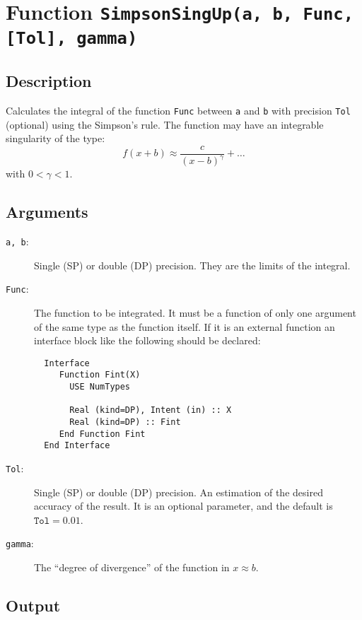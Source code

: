 \section{Function \texttt{SimpsonSingUp(a, b, Func, [Tol], gamma)}}

\subsection{Description}

Calculates the integral of the function \texttt{Func} between
\texttt{a} and \texttt{b} with precision \texttt{Tol} (optional) using
the Simpson's rule. The function may have an integrable singularity of
the type:
\begin{displaymath}
  f(x+b) \approx \frac{c}{(x-b)^\gamma} +  \dots
\end{displaymath}
with $0<\gamma<1$.

\subsection{Arguments}

\begin{description}
\item[\texttt{a, b}:] Single (SP) or double (DP) precision. They are
  the limits of the integral.
\item[\texttt{Func}:] The function to be integrated. It must be a
  function of only one argument of the same type as the function
  itself. If it is an
  external function an interface block like the following should be
  declared: 
\begin{verbatim}
  Interface 
     Function Fint(X)
       USE NumTypes

       Real (kind=DP), Intent (in) :: X
       Real (kind=DP) :: Fint
     End Function Fint
  End Interface
\end{verbatim}
\item[\texttt{Tol}:] Single (SP) or double (DP) precision. An
  estimation of the desired accuracy of the result. It is an optional
  parameter, and the default is $\mathtt{Tol} = 0.01$. 
\item[\texttt{gamma}:] The ``degree of divergence'' of the function in
  $x\approx b$. 
\end{description}


\subsection{Output}

